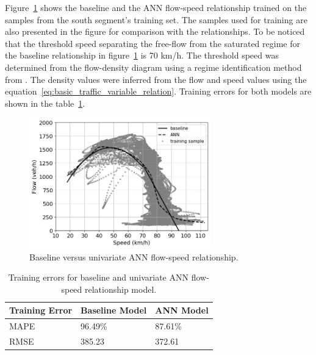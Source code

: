 \documentclass[english]{kththesis}
\begin{document}

Figure~\ref{fig:base_ann_training} shows the baseline and the ANN flow-speed relationship trained on the samples from the south segment's training set. The samples used for training are also presented in the figure for comparison with the relationships.  To be noticed that the threshold speed separating the free-flow from the saturated regime for the baseline relationship in figure~\ref{fig:base_ann_training} is 70 km/h. The threshold speed was determined from the flow-density diagram using a regime identification method from \cite{nielsen_flow-speed_relations}. The density values were inferred from the flow and speed values using the equation~\ref{eq:basic_traffic_variable_relation}. Training errors for both models are shown in the table~\ref{tab:training_errors}.

\begin{figure}[!ht]
    \centering
    \includegraphics[width=0.7\textwidth]{baseline_ann_training.png}
    \caption{Baseline versus univariate ANN flow-speed relationship.}
    \label{fig:base_ann_training}
\end{figure}

\begin{table}[!ht]
\centering
\begin{tabular}{@{}lll@{}}
\toprule
\textbf{Training Error} & \textbf{Baseline Model} & \textbf{ANN Model} \\
\midrule
MAPE          & 96.49\% & 87.61\%    \\
\midrule
RMSE          & 385.23  & 372.61     \\ 
\bottomrule
\end{tabular}
\caption{Training errors for baseline and univariate ANN flow-speed relationship model.}
\label{tab:training_errors}
\end{table}
\end{document}
